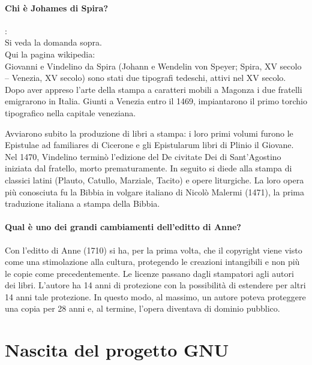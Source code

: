 \documentclass[a4paper]{article}
\begin{document}
		\paragraph{Chi è Johames di Spira?}: \\ %
		Si veda la domanda sopra.\\
		Qui la pagina wikipedia:\\
		Giovanni e Vindelino da Spira (Johann e Wendelin von Speyer; Spira, XV secolo – Venezia, XV secolo) sono stati due tipografi tedeschi, attivi nel XV secolo.
		Dopo aver appreso l'arte della stampa a caratteri mobili a Magonza i due fratelli emigrarono in Italia. Giunti a Venezia entro il 1469, impiantarono il primo torchio tipografico nella capitale veneziana.
		
		Avviarono subito la produzione di libri a stampa: i loro primi volumi furono le Epistulae ad familiares di Cicerone e gli Epistularum libri di Plinio il Giovane. Nel 1470, Vindelino terminò l'edizione del De civitate Dei di Sant'Agostino iniziata dal fratello, morto prematuramente. In seguito si diede alla stampa di classici latini (Plauto, Catullo, Marziale, Tacito) e opere liturgiche.
		La loro opera più conosciuta fu la Bibbia in volgare italiano di Nicolò Malermi (1471), la prima traduzione italiana a stampa della Bibbia.
		
		\paragraph{Qual è uno dei grandi cambiamenti dell'editto di Anne?}
		Con l'editto di Anne (1710) si ha, per la prima volta, che il copyright viene visto come una stimolazione alla cultura, protegendo le 
		creazioni intangibili e non più le copie come precedentemente. Le licenze passano dagli stampatori agli autori dei libri. L'autore ha 14 anni di protezione con la possibilità di estendere per altri 14 anni tale protezione. In questo modo, al massimo, un autore poteva proteggere una copia per 28 anni e, al termine, l'opera diventava di dominio pubblico.
	
	\section{Nascita del progetto GNU}
\end{document}
